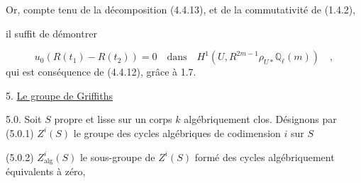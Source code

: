 Or, compte tenu de la décomposition (4.4.13), et de la commutativité de (1.4.2),

\begin{center}
\end{center}
il suffit de démontrer

\begin{equation*}
u_0(R(t_1) - R(t_2)) = 0 \quad \text{dans} \quad H^1(U,R^{2m-1}\rho_{U*}\mathbb{Q}_\ell(m)) \quad ,
\end{equation*}
qui est conséquence de (4.4.12), grâce à 1.7.


5.  \underline{Le groupe de Griffiths}

5.0.  Soit  $S$  propre et lisse sur un corps  $k$  algébriquement clos. Désignons par
(5.0.1)   $Z^i(S)$  le groupe des cycles algébriques de codimension $i$  sur $S$

(5.0.2)   $Z^i_{\mathrm{alg}}(S)$ le sous-groupe de  $Z^i(S)$  formé des cycles algébriquement équivalents à zéro,

